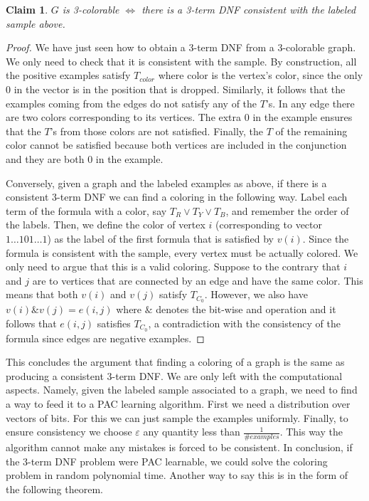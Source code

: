\documentclass[12pt, letterpaper]{article}
\numberwithin{equation}{section} %
\newcommand{\ve}{\varepsilon}
\newtheorem{claim}[theorem]{Claim}
\theoremstyle{definition}
\theoremstyle{remark}
\begin{document}
\begin{claim}
    $G$ is 3-colorable $\iff$ there is a 3-term DNF \emph{consistent} with the labeled sample above.
\end{claim}
\begin{proof}
    We have just seen how to obtain a 3-term DNF from a 3-colorable graph. We only need to check that it is consistent with the sample. By construction, all the positive examples satisfy $T_{color}$ where color is the vertex's color, since the only 0 in the vector is in the position that is dropped. Similarly, it follows that the examples coming from the edges do not satisfy any of the $T$'s. In any edge there are two colors corresponding to its vertices. The extra 0 in the example ensures that the $T$'s from those colors are not satisfied. Finally, the $T$ of the remaining color cannot be satisfied because both vertices are included in the conjunction and they are both 0 in the example.
    
    Conversely, given a graph and the labeled examples as above, if there is a consistent 3-term DNF we can find a coloring in the following way. Label each term of the formula with a color, say $T_R \lor T_Y \lor T_B$, and remember the order of the labels. Then, we define the color of vertex $i$ (corresponding to vector $1\ldots101\ldots1$) as the label of the first formula that is satisfied by $v(i)$. Since the formula is consistent with the sample, every vertex must be actually colored. We only need to argue that this is a valid coloring. Suppose to the contrary that $i$ and $j$ are to vertices that are connected by an edge and have the same color. This means that both $v(i)$ and $v(j)$ satisfy $T_{C_0}$. However, we also have $v(i) \& v(j) = e(i,j)$  where $\&$ denotes the bit-wise and operation and it follows that $e(i,j)$ satisfies $T_{C_0}$, a contradiction with the consistency of the formula since edges are negative examples.
\end{proof}

This concludes the argument that finding a coloring of a graph is the same as producing a consistent 3-term DNF. We are only left with the computational aspects. Namely, given the labeled sample associated to a graph, we need to find a way to feed it to a PAC learning algorithm. First we need a distribution over vectors of bits. For this we can just sample the examples uniformly. Finally, to ensure consistency we choose $\ve$ any quantity less than $\frac1{\#examples}$. This way the algorithm cannot make any mistakes is forced to be consistent. In conclusion, if the 3-term DNF problem were PAC learnable, we could solve the coloring problem in random polynomial time. Another way to say this is in the form of the following theorem.
\end{document}
